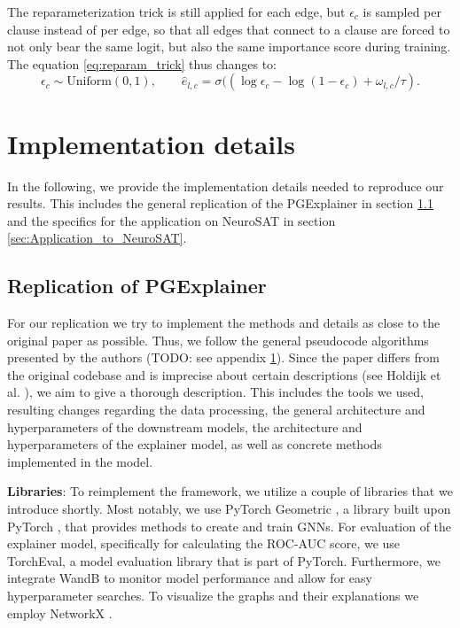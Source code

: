 The reparameterization trick is still applied for each edge, but $\epsilon_c$ is sampled per clause instead of per edge, so that all edges that connect to a clause are forced to not only bear the same logit, but also the same importance score during training. The equation \ref{eq:reparam_trick} thus changes to:
\begin{equation}
    \epsilon_c \sim \text{Uniform}(0,1), \qquad \hat{e}_{l,c}=\sigma((\log \epsilon_c - \log(1-\epsilon_c)+\omega_{l,c}/\tau).
\end{equation}


\section{Implementation details}
In the following, we provide the implementation details needed to reproduce our results. This includes the general replication of the PGExplainer \cite{} in section \ref{sec:Replication_of_PGExplainer} and the specifics for the application on NeuroSAT \cite{} in section \ref{sec:Application_to_NeuroSAT}.


\subsection{Replication of PGExplainer}
\label{sec:Replication_of_PGExplainer}

For our replication we try to implement the methods and details as close to the original paper as possible. Thus, we follow the general pseudocode algorithms presented by the authors (TODO: see appendix \ref{}). Since the paper differs from the original codebase and is imprecise about certain descriptions (see Holdijk et al. \cite{holdijk2021re}), we aim to give a thorough description. This includes the tools we used, resulting changes regarding the data processing, the general architecture and hyperparameters of the downstream models, the architecture and hyperparameters of the explainer model, as well as concrete methods implemented in the model. \bigskip

\textbf{Libraries}: To reimplement the framework, we utilize a couple of libraries that we introduce shortly. Most notably, we use PyTorch Geometric \cite{Fey/Lenssen/2019}, a library built upon PyTorch \cite{paszke2019pytorch}, that provides methods to create and train GNNs. For evaluation of the explainer model, specifically for calculating the ROC-AUC score, we use TorchEval, a model evaluation library that is part of PyTorch. Furthermore, we integrate WandB \cite{wandb} to monitor model performance and allow for easy hyperparameter searches. To visualize the graphs and their explanations we employ NetworkX \cite{SciPyProceedings_11}.\bigskip

